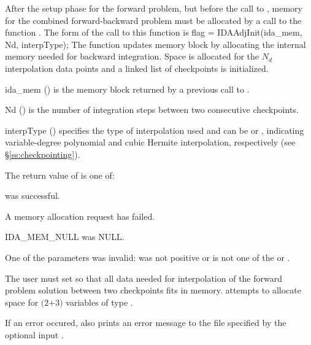 After the setup phase for the forward problem, but before the call
to , memory for the combined forward-backward problem must be
allocated by a call to the function .
The form of the call to this function is
{
  flag = IDAAdjInit(ida\_mem, Nd, interpType);
}
{
  The function  updates {\idas} memory block by allocating 
  the internal memory needed for backward integration.
  Space is allocated for the $N_d$ interpolation data points and a linked 
  list of checkpoints is initialized.
}
{
  \begin{args}[interpType]
  \item[ida\_mem] () 
    is the {\idas} memory block returned by a previous call to .
  \item[Nd] () 
    is the number of integration steps between two consecutive checkpoints.
  \item[interpType] ()
    specifies the type of interpolation used and can be 
    or , indicating variable-degree polynomial and cubic Hermite
    interpolation, respectively (see \S\ref{ss:checkpointing}).
  \end{args}
}
{
   The return value  of  is one of:
   \begin{args}
   \item[\Id{IDA\_SUCCESS}] 
      was successful.
   \item[\Id{IDA\_MEM\_FAIL}]
     A memory allocation request has failed.
   \item[IDA\_MEM\_NULL] 
      was NULL.
   \item[\Id{IDA\_ILL\_INPUT}]
     One of the parameters was invalid:  was not positive or 
     is not one of the  or .
   \end{args}
}
{
  The user must set  so that all data needed for interpolation of the 
  forward problem solution between two checkpoints fits in memory. 
  attempts to allocate space for $(2$$+3)$ variables of type .

  If an error occured,  also prints an error message to the
  file specified by the optional input .
}
